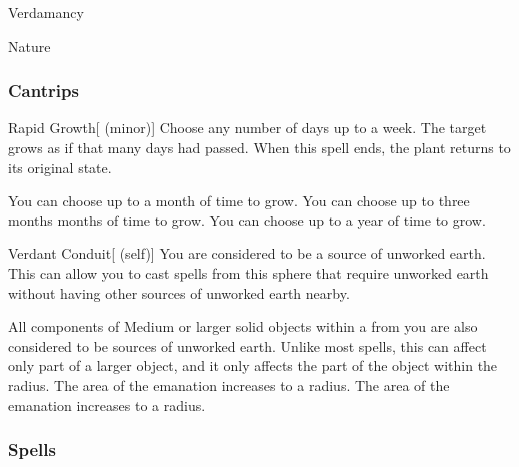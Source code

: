\newpage
\begin{spellsection}{Verdamancy}

\begin{spellheader}
\end{spellheader}


 Nature

\subsubsection{Cantrips}


\begin{freeability}{Rapid Growth}[ (minor)]
Choose any number of days up to a week.
The target grows as if that many days had passed.
When this spell ends, the plant returns to its original state.

\rankline
{} You can choose up to a month of time to grow.
 You can choose up to three months months of time to grow.
 You can choose up to a year of time to grow.
\end{freeability}


\begin{attuneability}{Verdant Conduit}[ (self)]
You are considered to be a source of unworked earth.
This can allow you to cast spells from this sphere that require unworked earth without having other sources of unworked earth nearby.

\rankline
{} All components of Medium or larger solid objects within a \areasmall {} from you are also considered to be sources of unworked earth.
Unlike most spells, this can affect only part of a larger object, and it only affects the part of the object within the radius.
 The area of the emanation increases to a \areamed radius.
 The area of the emanation increases to a \arealarge radius.
\end{attuneability}

\end{spellsection}


\subsubsection{Spells}


